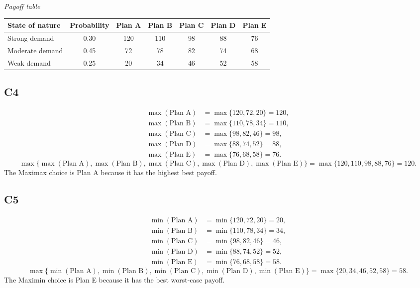 \begin{ExamProblems}
		\begin{center}
			\textit{Payoff table} \\
			\begin{tabular}{l c c c c c c}
				\toprule
				State of nature & Probability & Plan A & Plan B & Plan C & Plan D & Plan E \\
				\midrule
				Strong demand & 0.30 & 120 & 110 & 98 & 88 & 76 \\
				Moderate demand & 0.45 & 72 & 78 & 82 & 74 & 68 \\
				Weak demand & 0.25 & 20 & 34 & 46 & 52 & 58 \\
				\bottomrule
			\end{tabular}
		\end{center}
		
		\subsection*{C4}
		\[
		\begin{aligned}
		\max(\text{Plan A}) &= \max\{120,72,20\} = 120,\\
		\max(\text{Plan B}) &= \max\{110,78,34\} = 110,\\
		\max(\text{Plan C}) &= \max\{98,82,46\} = 98,\\
		\max(\text{Plan D}) &= \max\{88,74,52\} = 88,\\
		\max(\text{Plan E}) &= \max\{76,68,58\} = 76.
		\end{aligned}
		\]
		\[
		\max\{\max(\text{Plan A}), \max(\text{Plan B}), \max(\text{Plan C}), \max(\text{Plan D}), \max(\text{Plan E})\}
		= \max\{120, 110, 98, 88, 76\}
		= 120.
		\]
		The Maximax choice is Plan A because it has the highest best payoff.
		
		\subsection*{C5}
		\[
		\begin{aligned}
		\min(\text{Plan A}) &= \min\{120,72,20\} = 20,\\
		\min(\text{Plan B}) &= \min\{110,78,34\} = 34,\\
		\min(\text{Plan C}) &= \min\{98,82,46\} = 46,\\
		\min(\text{Plan D}) &= \min\{88,74,52\} = 52,\\
		\min(\text{Plan E}) &= \min\{76,68,58\} = 58.
		\end{aligned}
		\]
		\[
		\max\{\min(\text{Plan A}), \min(\text{Plan B}), \min(\text{Plan C}), \min(\text{Plan D}), \min(\text{Plan E})\}
		= \max\{20, 34, 46, 52, 58\}
		= 58.
		\]
		The Maximin choice is Plan E because it has the best worst-case payoff.
		

\end{ExamProblems}
